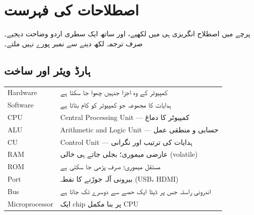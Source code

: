 %

\section*{اصطلاحات کی فہرست}
\label{sec:lughat}

پرچے میں اصطلاح انگریزی ہی میں لکھیے، اور ساتھ ایک سطری اردو وضاحت دیجیے۔ صرف
ترجمہ لکھ دینے سے نمبر پورے نہیں ملتے۔

\subsection*{ہارڈ ویئر اور ساخت}

\begin{center}
\begin{tabular}{@{}p{4.0cm} p{10.4cm}@{}}
\toprule
\textenglish{Hardware} & کمپیوٹر کے وہ اجزا جنہیں چھوا جا سکتا ہے \\
\textenglish{Software} & ہدایات کا مجموعہ جو کمپیوٹر کو کام بتاتا ہے \\
\textenglish{CPU} & \textenglish{Central Processing Unit} --- کمپیوٹر کا دماغ \\
\textenglish{ALU} & \textenglish{Arithmetic and Logic Unit} --- حسابی و منطقی عمل \\
\textenglish{CU} & \textenglish{Control Unit} --- ہدایات کی ترتیب اور نگرانی \\
\textenglish{RAM} & عارضی میموری؛ بجلی جاتے ہی خالی (\textenglish{volatile}) \\
\textenglish{ROM} & مستقل میموری؛ صرف پڑھی جا سکتی ہے \\
\textenglish{Port} & بیرونی آلہ جوڑنے کا نقطہ (\textenglish{USB}، \textenglish{HDMI}) \\
\textenglish{Bus} & اندرونی راستہ جس پر ڈیٹا ایک حصے سے دوسرے تک جاتا ہے \\
\textenglish{Microprocessor} & ایک \textenglish{chip} پر بنا مکمل \textenglish{CPU} \\
\bottomrule
\end{tabular}
\end{center}

